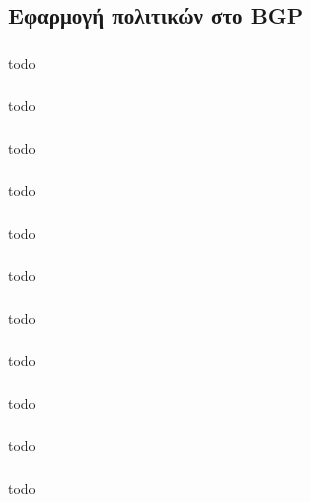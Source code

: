 \documentclass[a4paper, 12pt]{article}
\begin{document}
	\subsection{Εφαρμογή πολιτικών στο BGP}

		\subsubsection{}
			todo

		\subsubsection{}
			todo

		\subsubsection{}
			todo

		\subsubsection{}
			todo

		\subsubsection{}
			todo

		\subsubsection{}
			todo

		\subsubsection{}
			todo

		\subsubsection{}
			todo

		\subsubsection{}
			todo

		\subsubsection{}
			todo

		\subsubsection{}
			todo
\end{document}

